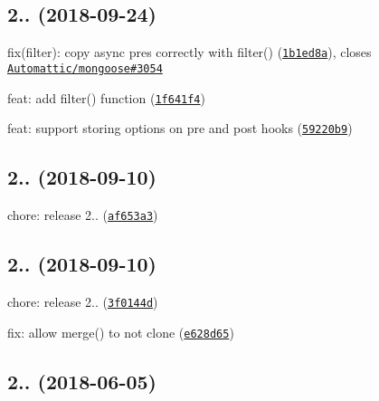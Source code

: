 \label{_2.2.3}%
 \subsection*{
\footnotesize 2.. (2018-\/09-\/24)
\normalsize }


\begin{DoxyItemize}
\item fix(filter)\+: copy async pres correctly with {\ttfamily filter()} (\href{https://github.com/vkarpov15/kareem/commit/1b1ed8a}{\tt 1b1ed8a}), closes \href{https://github.com/Automattic/mongoose/issues/3054}{\tt Automattic/mongoose\#3054}
\item feat\+: add filter() function (\href{https://github.com/vkarpov15/kareem/commit/1f641f4}{\tt 1f641f4})
\item feat\+: support storing options on pre and post hooks (\href{https://github.com/vkarpov15/kareem/commit/59220b9}{\tt 59220b9})
\end{DoxyItemize}

\label{_2.2.3}%
 \subsection*{
\footnotesize 2.. (2018-\/09-\/10)
\normalsize }


\begin{DoxyItemize}
\item chore\+: release 2.. (\href{https://github.com/vkarpov15/kareem/commit/af653a3}{\tt af653a3})
\end{DoxyItemize}

\label{_2.2.2}%
 \subsection*{
\footnotesize 2.. (2018-\/09-\/10)
\normalsize }


\begin{DoxyItemize}
\item chore\+: release 2.. (\href{https://github.com/vkarpov15/kareem/commit/3f0144d}{\tt 3f0144d})
\item fix\+: allow merge() to not clone (\href{https://github.com/vkarpov15/kareem/commit/e628d65}{\tt e628d65})
\end{DoxyItemize}

\label{_2.2.1}%
 \subsection*{
\footnotesize 2.. (2018-\/06-\/05)
\normalsize }


